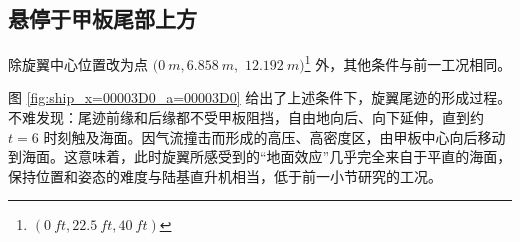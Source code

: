 \subsection{悬停于甲板尾部上方\label{subsec:x=00003D0_u=00003D5_a=00003D0}}
\begin{problem}
[直升机正面迎风悬停于甲板尾部上方]\label{prob:=0076F4=005347=00673A=006B63=009762=008FCE=0098CE=0060AC=00505C=004E8E=007532=00677F=005C3E=0090E8=004E0A=0065B9}除旋翼中心位置改为点
$(\SI{0}{m},\SI{6.858}{m},$ $\SI{12.192}{m})$\footnote{$(\SI{0}{ft},\SI{22.5}{ft},\SI{40}{ft})$}
外，其他条件与前一工况相同。
\end{problem}

图 \ref{fig:ship_x=00003D0_a=00003D0} 给出了上述条件下，旋翼尾迹的形成过程。不难发现：尾迹前缘和后缘都不受甲板阻挡，自由地向后、向下延伸，直到约
$t=6$ 时刻触及海面。因气流撞击而形成的高压、高密度区，由甲板中心向后移动到海面。这意味着，此时旋翼所感受到的“地面效应”几乎完全来自于平直的海面，保持位置和姿态的难度与陆基直升机相当，低于前一小节研究的工况。


